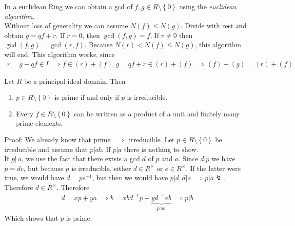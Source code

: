 In a euclidean Ring we can obtain a gcd of $f,g \in R \setminus \left\{0\right\}$ using the \emph{euclidean algorithm}.\\
Without loss of generality we can assume $N(f) \leq N(g)$.
Divide with rest and obtain $g = qf + r$. If $r = 0$, then $\gcd(f,g) = f$. If $r \neq 0$ then $\gcd(f,g) = \gcd(r,f)$. Because $N(r) < N(f) \leq N(g)$, this algorithm will end.
This algorithm works, since
\begin{align*}
	r = g - qf \in I \implies f \in (r) + (f), g = qf + r \in (r) + (f) \implies (f) + (g) = (r) + (f)
\end{align*}



\begin{theorem}
	Let $R$ be a principal ideal domain. Then 
	\begin{enumerate}
	\item $p \in R \setminus \left\{0\right\}$ is prime if and only if $p$ is irreducible.
	\item Every $f \in R \setminus \left\{0\right\}$ can be written as a product of a unit and finitely many prime elements.
	\end{enumerate}
\end{theorem}
Proof: We already know that prime $\implies$ irreducible. Let $p \in R \setminus \left\{0\right\}$ be irreducible and assume that $p |ab$. If $p|a$ there is nothing to show.\\
If $p \not|\ a$, we use the fact that there exists a gcd $d$ of $p$ and $a$. Since $d|p$ we have $p = de$, but because $p$ is irreducible, either $d \in R^{\times}$ or $e \in R^{\times}$. If the latter were true, we would have $d= pe^{-1}$, but then we would have $p|d, d|a \implies p|a \lightning$. Therefore $d \in R^{\times}$. Therefore
\begin{align*}
	d = xp + ya \implies b = xbd^{-1}p + \underbrace{yd^{-1}ab}_{p|ab} \implies p|b
\end{align*}
Which shows that $p$ is prime.
